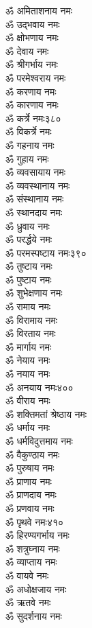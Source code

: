 \begin{center}
\begin{multicols}{2}
\begin{flushleft}
ॐ अमिताशनाय नमः\\
ॐ उद्भवाय नमः\\
ॐ क्षोभणाय नमः\\
ॐ देवाय नमः\\
ॐ श्रीगर्भाय नमः\\
ॐ परमेश्वराय नमः\\
ॐ करणाय नमः\\
ॐ कारणाय नमः\\
ॐ कर्त्रे नमः\hfill ३८०\\
ॐ विकर्त्रे नमः\\
ॐ गहनाय नमः\\
ॐ गुहाय नमः\\
ॐ व्यवसायाय नमः\\
ॐ व्यवस्थानाय नमः\\
ॐ संस्थानाय नमः\\
ॐ स्थानदाय नमः\\
ॐ ध्रुवाय नमः\\
ॐ परर्द्धये नमः\\
ॐ परमस्पष्टाय नमः\hfill ३९०\\
ॐ तुष्टाय नमः\\
ॐ पुष्टाय नमः\\
ॐ शुभेक्षणाय नमः\\
ॐ रामाय नमः\\
ॐ विरामाय नमः\\
ॐ विरताय नमः\\
ॐ मार्गाय नमः\\
ॐ नेयाय नमः\\
ॐ नयाय नमः\\
ॐ अनयाय नमः\hfill ४००\\
ॐ वीराय नमः\\
ॐ शक्तिमतां श्रेष्ठाय नमः\\
ॐ धर्माय नमः\\
ॐ धर्मविदुत्तमाय नमः\\
ॐ वैकुण्ठाय नमः\\
ॐ पुरुषाय नमः\\
ॐ प्राणाय नमः\\
ॐ प्राणदाय नमः\\
ॐ प्रणवाय नमः\\
ॐ पृथवे नमः\hfill ४१०\\
ॐ हिरण्यगर्भाय नमः\\
ॐ शत्रुघ्नाय नमः\\
ॐ व्याप्ताय नमः\\
ॐ वायवे नमः\\
ॐ अधोक्षजाय नमः\\
ॐ ऋतवे नमः\\
ॐ सुदर्शनाय नमः\\

\end{flushleft}
\end{multicols}
\end{center}
